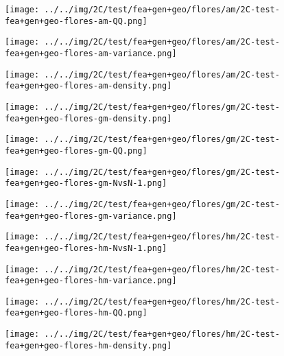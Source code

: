 \begin{figure}[H]
\centering	\texttt{[image: ../../img/2C/test/fea+gen+geo/flores/am/2C-test-fea+gen+geo-flores-am-QQ.png]}
\end{figure}
\begin{figure}[H]
\centering	\texttt{[image: ../../img/2C/test/fea+gen+geo/flores/am/2C-test-fea+gen+geo-flores-am-variance.png]}
\end{figure}
\begin{figure}[H]
\centering	\texttt{[image: ../../img/2C/test/fea+gen+geo/flores/am/2C-test-fea+gen+geo-flores-am-density.png]}
\end{figure}
\begin{figure}[H]
\centering	\texttt{[image: ../../img/2C/test/fea+gen+geo/flores/gm/2C-test-fea+gen+geo-flores-gm-density.png]}
\end{figure}
\begin{figure}[H]
\centering	\texttt{[image: ../../img/2C/test/fea+gen+geo/flores/gm/2C-test-fea+gen+geo-flores-gm-QQ.png]}
\end{figure}
\begin{figure}[H]
\centering	\texttt{[image: ../../img/2C/test/fea+gen+geo/flores/gm/2C-test-fea+gen+geo-flores-gm-NvsN-1.png]}
\end{figure}
\begin{figure}[H]
\centering	\texttt{[image: ../../img/2C/test/fea+gen+geo/flores/gm/2C-test-fea+gen+geo-flores-gm-variance.png]}
\end{figure}
\begin{figure}[H]
\centering	\texttt{[image: ../../img/2C/test/fea+gen+geo/flores/hm/2C-test-fea+gen+geo-flores-hm-NvsN-1.png]}
\end{figure}
\begin{figure}[H]
\centering	\texttt{[image: ../../img/2C/test/fea+gen+geo/flores/hm/2C-test-fea+gen+geo-flores-hm-variance.png]}
\end{figure}
\begin{figure}[H]
\centering	\texttt{[image: ../../img/2C/test/fea+gen+geo/flores/hm/2C-test-fea+gen+geo-flores-hm-QQ.png]}
\end{figure}
\begin{figure}[H]
\centering	\texttt{[image: ../../img/2C/test/fea+gen+geo/flores/hm/2C-test-fea+gen+geo-flores-hm-density.png]}
\end{figure}
